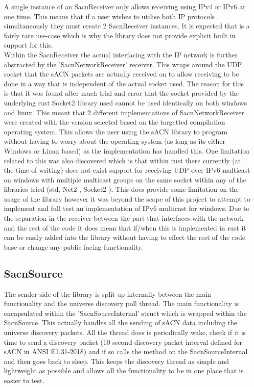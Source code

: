 \documentclass[11pt,a4paper]{article}
\begin{document}
A single instance of an SacnReceiver only allows receiving using IPv4 or IPv6 at one time. This means that if a user wishes to utilise both IP protocols simultaneously they must create 2 SacnReceiver instances. It is expected that is a fairly rare use-case which is why the library does not provide explicit built in support for this. \\

Within the SacnReceiver the actual interfacing with the IP network is further abstracted by the 'SacnNetworkReceiver' receiver. This wraps around the UDP socket that the sACN packets are actually received on to allow receiving to be done in a way that is independent of the actual socket used. The reason for this is that it was found after much trial and error that the socket provided by the underlying rust Socket2 library used cannot be used identically on both windows and linux. This meant that 2 different implementations of SacnNetworkReceiver were created with the version selected based on the targetted compilation operating system. This allows the user using the sACN library to program without having to worry about the operating system (as long as its either Windows or Linux based) as the implementation has handled this. One limitation related to this was also discovered which is that within rust there currently (at the time of writing) does not exist support for receiving UDP over IPv6 multicast on windows with multiple multicast groups on the same socket within any of the libraries tried (std, Net2 \cite{NET2}, Socket2 \cite{SOCKET2}). This does provide some limitation on the usage of the library however it was beyond the scope of this project to attempt to implement and full test an implementation of IPv6 multicast for windows. Due to the separation in the receiver between the part that interfaces with the network and the rest of the code it does mean that if/when this is implemented in rust it can be easily added into the library without having to effect the rest of the code base or change any public facing functionality.\\

\subsection{SacnSource}
The sender side of the library is split up internally between the main functionality and the universe discovery poll thread. The main functionality is encapsulated within the 'SacnSourceInternal' struct which is wrapped within the SacnSource. This actually handles all the sending of sACN data including the universe discovery packets. All the thread does is periodically wake, check if it is time to send a discovery packet (10 second discovery packet interval defined for sACN in ANSI E1.31-2018) and if so calls the method on the SacnSourceInternal and then goes back to sleep. This keeps the discovery thread as simple and lightweight as possible and allows all the functionality to be in one place that is easier to test. \\
\end{document}
